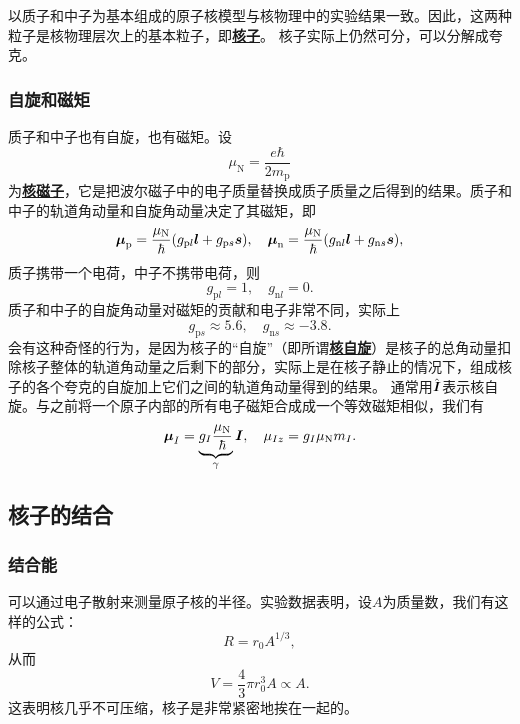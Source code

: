 \documentclass[UTF8, a4paper]{ctexart}
\newcommand*{\concept}[1]{\underline{\textbf{#1}}}
\begin{document}
以质子和中子为基本组成的原子核模型与核物理中的实验结果一致。因此，这两种粒子是核物理层次上的基本粒子，即\concept{核子}。
核子实际上仍然可分，可以分解成夸克。

\subsubsection{自旋和磁矩}

质子和中子也有自旋，也有磁矩。设
\begin{equation}
    \mu_\text{N} = \frac{e \hbar}{2 m_\text{p}}
\end{equation}
为\concept{核磁子}，它是把波尔磁子中的电子质量替换成质子质量之后得到的结果。质子和中子的轨道角动量和自旋角动量决定了其磁矩，即
\begin{equation}
    \vb*{\mu}_\text{p} = \frac{\mu_\text{N}}{\hbar} (g_{\text{p} l} \vb*{l} + g_{\text{p} s} \vb*{s}), \quad 
    \vb*{\mu}_\text{n} = \frac{\mu_\text{N}}{\hbar} (g_{\text{n} l} \vb*{l} + g_{\text{n} s} \vb*{s}),
\end{equation}
质子携带一个电荷，中子不携带电荷，则
\begin{equation}
    g_{\text{p}l} = 1, \quad g_{\text{n} l} = 0.
\end{equation}
质子和中子的自旋角动量对磁矩的贡献和电子非常不同，实际上
\begin{equation}
    g_{\text{p} s} \approx 5.6, \quad g_{\text{n} s} \approx -3.8.
\end{equation}
会有这种奇怪的行为，是因为核子的“自旋”（即所谓\concept{核自旋}）是核子的总角动量扣除核子整体的轨道角动量之后剩下的部分，实际上是在核子静止的情况下，组成核子的各个夸克的自旋加上它们之间的轨道角动量得到的结果。
通常用$\hat{\vb*{I}}$表示核自旋。与之前将一个原子内部的所有电子磁矩合成成一个等效磁矩相似，我们有
\begin{equation}
    \vb*{\mu}_I = \underbrace{g_I \frac{\mu_\text{N}}{\hbar}}_\gamma \vb*{I}, \quad \mu_{Iz} = g_I \mu_\text{N} m_I.
\end{equation}

\subsection{核子的结合}

\subsubsection{结合能}

可以通过电子散射来测量原子核的半径。实验数据表明，设$A$为质量数，我们有这样的公式：
\begin{equation}
    R = r_0 A^{1/3},
\end{equation}
从而
\[
    V = \frac{4}{3} \pi r_0^3 A \propto A.
\]
这表明核几乎不可压缩，核子是非常紧密地挨在一起的。
\end{document}
